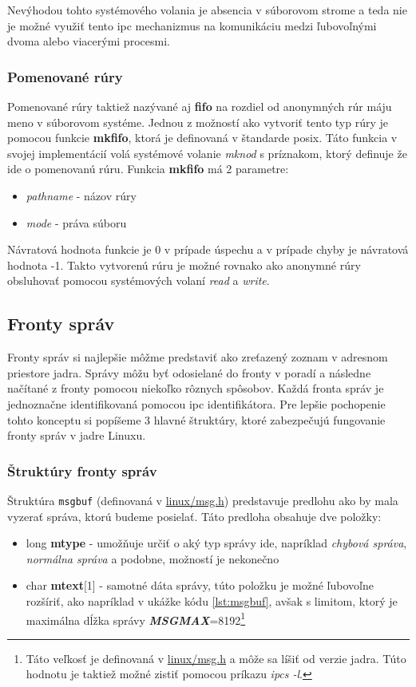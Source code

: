 Nevýhodou tohto systémového volania je absencia v súborovom strome a teda nie je možné využiť tento \acrshort{ipc} mechanizmus na komunikáciu medzi ľubovoľnými dvoma alebo viacerými procesmi.\cite{overview}
\subsubsection{Pomenované rúry}
Pomenované rúry taktiež nazývané aj \textbf{\acrshort{fifo}} na rozdiel od anonymných rúr máju meno v súborovom systéme. Jednou z možností ako vytvoriť tento typ rúry je pomocou funkcie \textbf{mkfifo}, ktorá je definovaná v štandarde \acrshort{posix}. Táto funkcia v svojej implementácií volá systémové volanie \textit{mknod} s príznakom, ktorý definuje že ide o pomenovanú rúru. Funkcia \textbf{mkfifo} má 2 parametre:
\begin{itemize}
\item \textit{pathname} - názov rúry
\item \textit{mode} - práva súboru 
\end{itemize}
Návratová hodnota funkcie je 0 v prípade úspechu a v prípade chyby je návratová hodnota -1. Takto vytvorenú rúru je možné rovnako ako anonymné rúry obsluhovať pomocou systémových volaní \textit{read} a \textit{write}.\cite{mkfifo}

\subsection{Fronty správ}
Fronty správ si najlepšie môžme predstaviť ako zreťazený zoznam v adresnom priestore jadra. Správy môžu byť odosielané do fronty v poradí a následne načítané z fronty pomocou niekoľko rôznych spôsobov. Každá fronta správ je jednoznačne identifikovaná pomocou \acrshort{ipc} identifikátora. Pre lepšie pochopenie tohto konceptu si popíšeme 3 hlavné štruktúry, ktoré zabezpečujú fungovanie fronty správ v jadre Linuxu.\cite{guide}
\subsubsection{Štruktúry fronty správ}
Štruktúra \texttt{msgbuf} (definovaná v \url{linux/msg.h}) predstavuje predlohu ako by mala vyzerať správa, ktorú budeme posielať. Táto predloha obsahuje dve položky: 
\begin{itemize}
\item long \textbf{mtype} - umožňuje určiť o aký typ správy ide, napríklad \textit{chybová správa}, \textit{normálna správa} a podobne, možností je nekonečno
\item char \textbf{mtext}[1] - samotné dáta správy, túto položku je možné ľubovoľne rozšíriť, ako napríklad v ukážke kódu \ref{lst:msgbuf}, avšak s limitom, ktorý je maximálna dĺžka správy \textit{\textbf{MSGMAX}}=8192\footnote{Táto veľkosť je definovaná v \url{linux/msg.h} a môže sa líšiť od verzie jadra. Túto hodnotu je taktiež možné zistiť pomocou príkazu \textit{ipcs -l}.}
\end{itemize}

